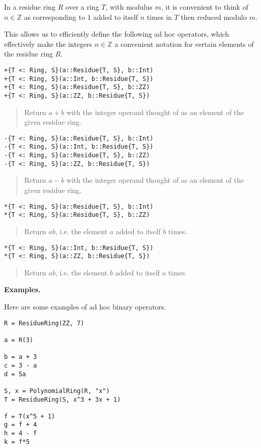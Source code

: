 \documentclass[a4paper,10pt]{article}
\newcommand{\Z}{\mathbb{Z}}
\newcommand{\desc}[1]{\vspace{-3mm}\begin{quote}#1\end{quote}}
\begin{document}
{{{In a residue ring $R$ over a ring $T$, with modulus $m$, it is convenient
to think of $n \in \Z$ as corresponding to $1$ added to itself $n$ times
in $T$ then reduced modulo $m$.

This allows us to efficiently define the following ad hoc operators, which
effectively make the integers $n \in \Z$ a convenient notation for certain
elements of the residue ring $R$.

\begin{lstlisting}
+{T <: Ring, S}(a::Residue{T, S}, b::Int)
+{T <: Ring, S}(a::Int, b::Residue{T, S})
+{T <: Ring, S}(a::Residue{T, S}, b::ZZ)
+{T <: Ring, S}(a::ZZ, b::Residue{T, S})
\end{lstlisting}

\desc{Return $a + b$ with the integer operand thought of as an element of 
the given residue ring.}

\begin{lstlisting}
-{T <: Ring, S}(a::Residue{T, S}, b::Int)
-{T <: Ring, S}(a::Int, b::Residue{T, S})
-{T <: Ring, S}(a::Residue{T, S}, b::ZZ)
-{T <: Ring, S}(a::ZZ, b::Residue{T, S})
\end{lstlisting}

\desc{Return $a - b$ with the integer operand thought of as an element of 
the given residue ring.}

\begin{lstlisting}
*{T <: Ring, S}(a::Residue{T, S}, b::Int)
*{T <: Ring, S}(a::Residue{T, S}, b::ZZ)
\end{lstlisting}

\desc{Return $ab$, i.e. the element $a$ added to itself $b$ times.}

\begin{lstlisting}
*{T <: Ring, S}(a::Int, b::Residue{T, S})
*{T <: Ring, S}(a::ZZ, b::Residue{T, S})
\end{lstlisting}

\desc{Return $ab$, i.e. the element $b$ added to itself $a$ times.}

\textbf{Examples.}

Here are some examples of ad hoc binary operators.

\begin{lstlisting}
R = ResidueRing(ZZ, 7)

a = R(3)

b = a + 3
c = 3 - a
d = 5a

S, x = PolynomialRing(R, "x")
T = ResidueRing(S, x^3 + 3x + 1)

f = T(x^5 + 1)
g = f + 4
h = 4 - f
k = f*5
\end{lstlisting}

}}}
\end{document}
